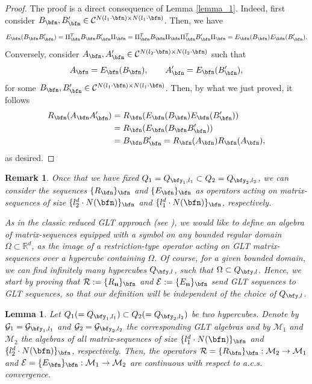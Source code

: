 \documentclass{amsart}
\newtheorem{lem}[thm]{Lemma}
\newtheorem{rem}[thm]{Remark}
\begin{document}
\begin{proof}
    The proof is a direct consequence of Lemma \ref{lemma_1}. Indeed, first consider $B_\bfn,B'_\bfn\in\mathcal{C}^{N(l_1\cdot\bfn)\times N(l_1\cdot\bfn)}$. Then, we have
    \begin{equation*}
        E_\bfn(B_\bfn B'_\bfn)=\Pi_{\bfn}^T B_{\bfn}B'_{\bfn}\Pi_{\bfn}=\Pi_{\bfn}^T B_{\bfn}\Pi_{\bfn}\Pi_{\bfn}^TB'_{\bfn}\Pi_{\bfn}=E_\bfn(B_\bfn )E_\bfn(B'_\bfn).
    \end{equation*}
    Conversely, consider $A_\bfn,A'_\bfn\in\mathcal{C}^{N(l_2\cdot\bfn)\times N(l_2\cdot\bfn)}$ such that 
    \begin{equation*}
        A_\bfn=E_\bfn(B_\bfn),\qquad A'_\bfn=E_\bfn(B'_\bfn),
    \end{equation*}
    for some $B_\bfn,B'_\bfn\in\mathcal{C}^{N(l_1\cdot\bfn)\times N(l_1\cdot\bfn)}$. Then, by what we just proved, it follows
    \begin{align*}
        R_\bfn(A_\bfn A'_\bfn)&=R_\bfn(E_\bfn(B_\bfn)E_\bfn(B'_\bfn))\\
            &=R_\bfn(E_\bfn(B_\bfn B'_\bfn))\\
            &=B_\bfn B'_\bfn = R_\bfn(A_\bfn)R_\bfn(A_\bfn),
    \end{align*}
    as desired.
\end{proof}
\begin{rem}
Once that we have fixed $Q_1=Q_{{\bfy_1},l_1}\subset Q_2=Q_{{\bfy_2},l_2}$, we can consider the sequences $\{R_{\bfn}\}_{\bfn}$ and $\{E_{\bfn}\}_{\bfn}$ as operators acting on matrix-sequences of size $\{l_2^d\cdot N(\bfn)\}_{\bfn}$ and $\{l_1^d\cdot N(\bfn)\}_{\bfn}$, respectively. 

As in the classic reduced GLT approach (see \cite{Barb}), we would like to define an algebra of matrix-sequences equipped with a symbol on any bounded regular domain $\Omega\subset\mathbb{R}^d$, as the image of a restriction-type operator acting on GLT matrix-sequences over a hypercube containing $\Omega$. Of course, for a given bounded domain, we can find infinitely many hypercubes $Q_{\bfy,l}$, such that $\Omega\subset Q_{\bfy,l}$. Hence, we start by proving that $\mathcal{R}:=\{R_{\bf n}\}_\bfn$ and $\mathcal{E}:=\{E_{\bf n}\}_\bfn$ send GLT sequences to GLT sequences, so that our definition will be independent of the choice of $Q_{\bfy,l}$.
\end{rem}
\begin{lem}\label{acs_cts_operators}
    Let $Q_1(=Q_{{\bfy_1},l_1})\subset Q_2(=Q_{{\bfy_2},l_2})$ be two hypercubes. Denote by $\mathcal{G}_1=\mathcal{G}_{{\bfy_1},l_1}$ and $\mathcal{G}_2=\mathcal{G}_{{\bfy_2},l_2}$ the corresponding GLT algebras and by $\mathcal{M}_1$ and $\mathcal{M}_2$ the algebras of all matrix-sequences of size $\{l_1^d\cdot N(\bfn)\}_\bfn$ and $\{l_2^d\cdot N(\bfn)\}_\bfn$, respectively. Then, the operators $\mathcal{R}=\{R_{\bfn}\}_\bfn:\mathcal{M}_2\to\mathcal{M}_1$ and $\mathcal{E}=\{E_{\bfn}\}_\bfn:\mathcal{M}_1\to\mathcal{M}_2$ are continuous with respect to a.c.s. convergence.
\end{lem}
\end{document}
